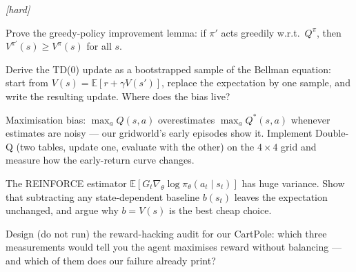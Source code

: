 \emph{[hard]}
\begin{exercise}
Prove the greedy-policy improvement lemma: if $\pi'$ acts greedily
w.r.t.\ $Q^\pi$, then $V^{\pi'}(s) \geq V^\pi(s)$ for all $s$.
\end{exercise}
\begin{exercise}
Derive the TD(0) update as a bootstrapped sample of the Bellman
equation: start from $V(s) = \mathbb E[r + \gamma V(s')]$, replace the
expectation by one sample, and write the resulting update. Where does
the bias live?
\end{exercise}
\begin{exercise}
Maximisation bias: $\max_a Q(s,a)$ overestimates $\max_a Q^*(s,a)$
whenever estimates are noisy --- our gridworld's early episodes
show it. Implement Double-Q (two tables, update one, evaluate with
the other) on the $4\times4$ grid and measure how the early-return
curve changes.
\end{exercise}
\begin{exercise}
The REINFORCE estimator
$\mathbb E[G_t \nabla_\theta \log \pi_\theta(a_t\mid s_t)]$ has huge
variance. Show that subtracting any state-dependent baseline
$b(s_t)$ leaves the expectation unchanged, and argue why
$b = V(s)$ is the best cheap choice.
\end{exercise}
\begin{exercise}
Design (do not run) the reward-hacking audit for our CartPole:
which three measurements would tell you the agent maximises
reward without balancing --- and which of them does our failure
already print?
\end{exercise}

